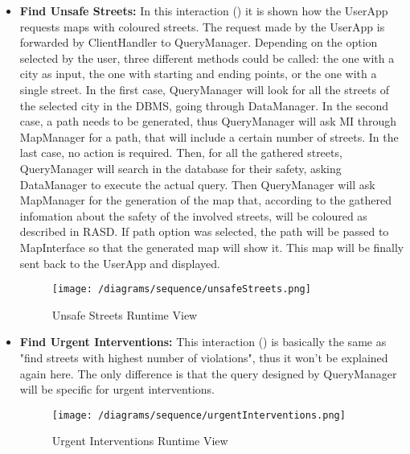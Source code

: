 \begin{itemize}
				\item \textbf{Find Unsafe Streets:} In this interaction () it is shown how the UserApp requests maps with coloured streets. The request made by the UserApp is forwarded by ClientHandler to QueryManager. Depending on the option selected by the user, three different methods could be called: the one with a city as input, the one with starting and ending points, or the one with a single street. In the first case, QueryManager will look for all the streets of the selected city in the DBMS, going through DataManager. In the second case, a path needs to be generated, thus QueryManager will ask MI through MapManager for a path, that will include a certain number of streets. In the last case, no action is required. Then, for all the gathered streets, QueryManager will search in the database for their safety, asking DataManager to execute the actual query. Then QueryManager will ask MapManager for the generation of the map that, according to the gathered infomation about the safety of the involved streets, will be coloured as described in RASD. If path option was selected, the path will be passed to MapInterface so that the generated map will show it. This map will be finally sent back to the UserApp and displayed.
				
				\vspace{1cm}		
		
				\begin{figure}[h!]
					\centering
					\texttt{[image: /diagrams/sequence/unsafeStreets.png]}
					\caption{\label{fig:unsafeStreetsRuntime} Unsafe Streets Runtime View}
				\end{figure}
			
				\newpage
			
				\item \textbf{Find Urgent Interventions:} This interaction () is basically the same as "find streets with highest number of violations", thus it won't be explained again here. The only difference is that the query designed by QueryManager will be specific for urgent interventions.
				
				\begin{figure}[h!]
					\centering
					\texttt{[image: /diagrams/sequence/urgentInterventions.png]}
					\caption{\label{fig:urgentInterventionsRuntime} Urgent Interventions Runtime View}
				\end{figure}
			\end{itemize}
		
